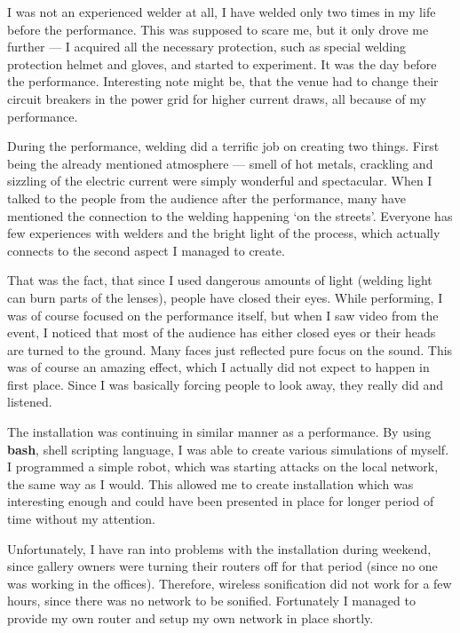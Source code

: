 \documentclass[12pt,a4paper,oneside]{report}
\begin{document}
I was not an experienced welder at all, I have welded only two times in my life before the performance. This was supposed to scare me, but it only drove me further --- I acquired all the necessary protection, such as special welding protection helmet and gloves, and started to experiment. It was the day before the performance. Interesting note might be, that the venue had to change their circuit breakers in the power grid for higher current draws, all because of my performance.

During the performance, welding did a terrific job on creating two things. First being the already mentioned atmosphere --- smell of hot metals, crackling and sizzling of the electric current were simply wonderful and spectacular. When I talked to the people from the audience after the performance, many have mentioned the connection to the welding happening `on the streets'. Everyone has few experiences with welders and the bright light of the process, which actually connects to the second aspect I managed to create. 

That was the fact, that since I used dangerous amounts of light (welding light can burn parts of the lenses), people have closed their eyes. While performing, I was of course focused on the performance itself, but when I saw video from the event, I noticed that most of the audience has either closed eyes or their heads are turned to the ground. Many faces just reflected pure focus on the sound. This was of course an amazing effect, which I actually did not expect to happen in first place. Since I was basically forcing people to look away, they really did and listened.

The installation was continuing in similar manner as a performance. By using \textbf{bash}, shell scripting language, I was able to create various simulations of myself. I programmed a simple robot, which was starting attacks on the local network, the same way as I would. This allowed me to create installation which was interesting enough and could have been presented in place for longer period of time without my attention.

Unfortunately, I have ran into problems with the installation during weekend, since gallery owners were turning their routers off for that period (since no one was working in the offices). Therefore, wireless sonification did not work for a few hours, since there was no network to be sonified. Fortunately I managed to provide my own router and setup my own network in place shortly.
\end{document}

